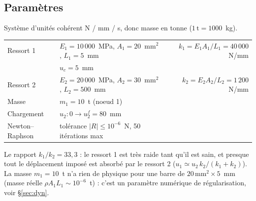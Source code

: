\documentclass[11pt,a4paper]{article}
\begin{document}
\subsection{Paramètres}
Système d'unités cohérent N / mm / s, donc masse en tonne ($1\,\mathrm{t}=1000$~kg).
\begin{center}
\begin{tabular}{llr}
\toprule
Ressort 1 & $E_1 = 10\,000$~MPa, $A_1 = 20$~mm$^2$, $L_1 = 5$~mm & $k_1 = E_1A_1/L_1 = 40\,000$~N/mm\\
          & $u_c = 5$~mm & \\
Ressort 2 & $E_2 = 20\,000$~MPa, $A_2 = 30$~mm$^2$, $L_2 = 500$~mm & $k_2 = E_2A_2/L_2 = 1\,200$~N/mm\\
Masse     & $m_1 = 10$~t (noeud 1) & \\
Chargement & $u_2 : 0 \to u_2^f = 80$~mm & \\
Newton--Raphson & tolérance $|R|\le 10^{-6}$~N, 50 itérations max & \\
\bottomrule
\end{tabular}
\end{center}
Le rapport $k_1/k_2 = 33{,}3$ : le ressort 1 est très raide tant qu'il est sain, et presque tout le
déplacement imposé est absorbé par le ressort 2 ($u_1 \simeq u_2\,k_2/(k_1+k_2)$). La masse
$m_1=10$~t n'a rien de physique pour une barre de $20\,\mathrm{mm}^2\times5$~mm (masse réelle
$\rho A_1 L_1\sim 10^{-6}$~t) : c'est un paramètre numérique de régularisation, voir \S\ref{sec:dyn}.
\end{document}
